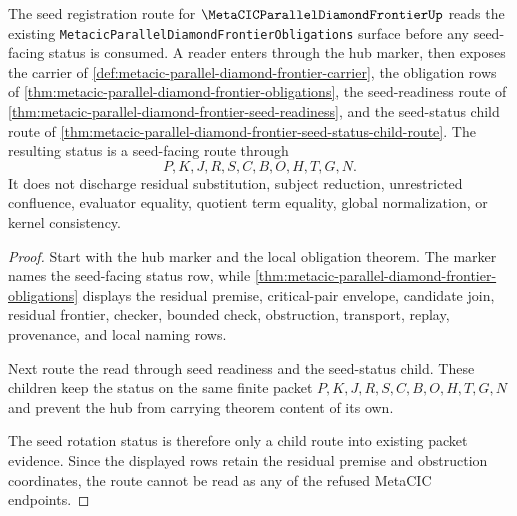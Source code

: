\begin{theorem}
\label{thm:metacic-parallel-diamond-frontier-seed-rotation-status}
The seed registration route for $\MetaCICParallelDiamondFrontierUp$ reads the existing \texttt{MetacicParallelDiamondFrontierObligations} surface before any seed-facing status is consumed. A reader enters through the hub marker, then exposes the carrier of \autoref{def:metacic-parallel-diamond-frontier-carrier}, the obligation rows of \autoref{thm:metacic-parallel-diamond-frontier-obligations}, the seed-readiness route of \autoref{thm:metacic-parallel-diamond-frontier-seed-readiness}, and the seed-status child route of \autoref{thm:metacic-parallel-diamond-frontier-seed-status-child-route}. The resulting status is a seed-facing route through
$$
P,K,J,R,S,C,B,O,H,T,G,N .
$$
It does not discharge residual substitution, subject reduction, unrestricted confluence, evaluator equality, quotient term equality, global normalization, or kernel consistency.
\end{theorem}
\begin{proof}
Start with the hub marker and the local obligation theorem. The marker names the seed-facing status row, while \autoref{thm:metacic-parallel-diamond-frontier-obligations} displays the residual premise, critical-pair envelope, candidate join, residual frontier, checker, bounded check, obstruction, transport, replay, provenance, and local naming rows.

Next route the read through seed readiness and the seed-status child. These children keep the status on the same finite packet $P,K,J,R,S,C,B,O,H,T,G,N$ and prevent the hub from carrying theorem content of its own.

The seed rotation status is therefore only a child route into existing packet evidence. Since the displayed rows retain the residual premise and obstruction coordinates, the route cannot be read as any of the refused MetaCIC endpoints.
\end{proof}
